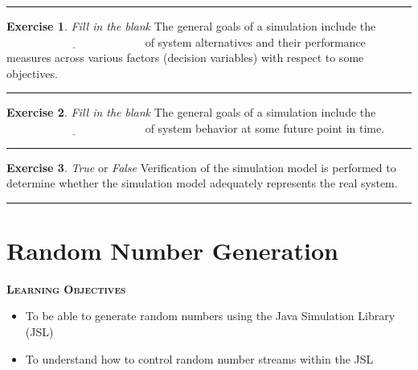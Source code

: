 \documentclass[
]{book}
\providecommand{\tightlist}{%
  \setlength{\itemsep}{0pt}\setlength{\parskip}{0pt}}
\theoremstyle{definition}
\theoremstyle{definition}
\theoremstyle{definition}
\newtheorem{exercise}{Exercise}[chapter]
\theoremstyle{definition}
\theoremstyle{remark}
\begin{document}
\begin{center}\rule{0.5\linewidth}{0.5pt}\end{center}

\begin{exercise}
\protect\hypertarget{exr:ch1P9}{}{\label{exr:ch1P9} }\emph{Fill in the blank} The general goals of a simulation include the \(\underline{\hspace{2in}}\) of system alternatives and their
performance measures across various factors (decision variables) with
respect to some objectives.
\end{exercise}

\begin{center}\rule{0.5\linewidth}{0.5pt}\end{center}

\begin{exercise}
\protect\hypertarget{exr:ch1P10}{}{\label{exr:ch1P10} }\emph{Fill in the blank} The general goals of a simulation include the \(\underline{\hspace{2in}}\) of system behavior at some future point
in time.
\end{exercise}

\begin{center}\rule{0.5\linewidth}{0.5pt}\end{center}

\begin{exercise}
\protect\hypertarget{exr:ch1P11}{}{\label{exr:ch1P11} }\emph{True} or \emph{False} Verification of the simulation model is performed to
determine whether the simulation model adequately represents the real
system.
\end{exercise}

\begin{center}\rule{0.5\linewidth}{0.5pt}\end{center}

\hypertarget{ch2:rng}{%
\chapter{Random Number Generation}\label{ch2:rng}}

\textbf{\textsc{Learning Objectives}}

\begin{itemize}
\tightlist
\item
  To be able to generate random numbers using the Java Simulation
  Library (JSL)
\item
  To understand how to control random number streams within the JSL
\end{itemize}
\end{document}
